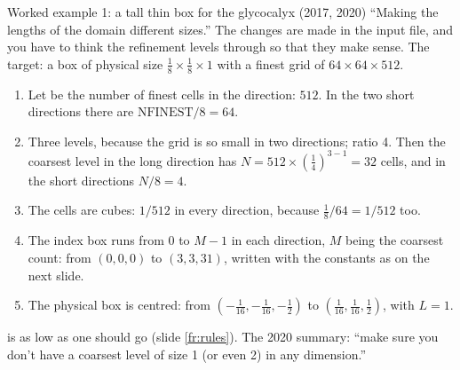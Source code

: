 \documentclass[aspectratio=169,11pt]{beamer}
\begin{document}
\begin{frame}{Worked example 1: a tall thin box for the glycocalyx (2017, 2020)}
\label{fr:ex1}
\small ``Making the lengths of the domain different sizes.'' The changes are made in the input file, and you have to think the refinement levels through so that they make sense. The target: a box of physical size $\frac18 \times \frac18 \times 1$ with a finest grid of $64 \times 64 \times 512$.
\begin{enumerate}
  \item Let  be the number of finest cells in the  direction: $512$. In the two short directions there are $\mathrm{NFINEST}/8 = 64$.
  \item Three levels, because the grid is so small in two directions; ratio 4. Then the coarsest level in the long direction has $N = 512 \times (\tfrac14)^{3-1} = 32$ cells, and in the short directions $N/8 = 4$.
  \item The cells are cubes: $1/512$ in every direction, because $\frac18 / 64 = 1/512$ too.
  \item The index box runs from $0$ to $M - 1$ in each direction, $M$ being the coarsest count: from $(0,0,0)$ to $(3, 3, 31)$, written with the constants as on the next slide.
  \item The physical box is centred: from $(-\tfrac1{16}, -\tfrac1{16}, -\tfrac12)$ to $(\tfrac1{16}, \tfrac1{16}, \tfrac12)$, with $L = 1$.
\end{enumerate}
\vspace{1mm}
\begin{punchbox}
\small {} is as low as one should go (slide \ref{fr:rules}). The 2020 summary: ``make sure you don't have a coarsest level of size 1 (or even 2) in any dimension.''
\end{punchbox}
\end{frame}
\end{document}
